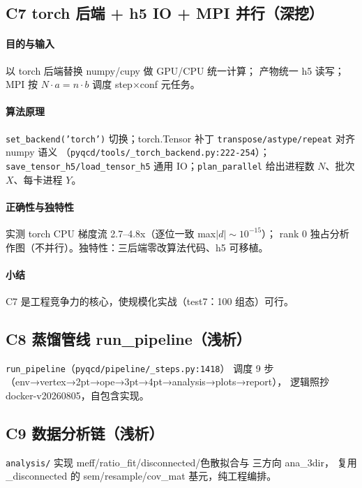 \documentclass[UTF8]{ctexart}
\begin{document}
\subsection{C7 torch 后端 + h5 IO + MPI 并行（深挖）}
\paragraph{目的与输入} 以 torch 后端替换 numpy/cupy 做 GPU/CPU 统一计算；
产物统一 h5 读写；MPI 按 $N\cdot a=n\cdot b$ 调度 step×conf 元任务。
\paragraph{算法原理} \texttt{set\_backend('torch')} 切换；torch.Tensor 补丁
\texttt{transpose/astype/repeat} 对齐 numpy 语义
（\textcolor{evidence}{\texttt{\nolinkurl{pyqcd/tools/_torch_backend.py:222-254}}}）；
\texttt{save\_tensor\_h5/load\_tensor\_h5} 通用 IO；\texttt{plan\_parallel} 给出进程数 $N$、批次 $X$、每卡进程 $Y$。
\paragraph{正确性与独特性} 实测 torch CPU 梯度流 2.7--4.8x（逐位一致 max$|d|\sim10^{-15}$）；
rank 0 独占分析作图（不并行）。独特性：三后端零改算法代码、h5 可移植。
\paragraph{小结} C7 是工程竞争力的核心，使规模化实战（test7：100 组态）可行。

\subsection{C8 蒸馏管线 run\_pipeline（浅析）}
\texttt{run\_pipeline}（\textcolor{evidence}{\texttt{\nolinkurl{pyqcd/pipeline/_steps.py:1418}}}）
调度 9 步（env→vertex→2pt→ope→3pt→4pt→analysis→plots→report），
逻辑照抄 docker-v20260805，自包含实现。

\subsection{C9 数据分析链（浅析）}
\texttt{analysis/} 实现 meff/ratio\_fit/disconnected/色散拟合与 三方向 ana\_3dir，
复用 \_disconnected 的 sem/resample/cov\_mat 基元，纯工程编排。

\end{document}
